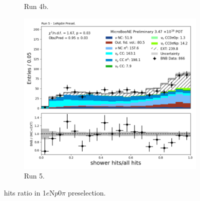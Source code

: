 \begin{figure}[H]
\begin{subfigure}[t]{0.32\linewidth}
        \caption{Run 4b.}
    \end{subfigure}%
    \hspace{0.2cm}%
    \begin{subfigure}[t]{0.32\linewidth}
        \includegraphics[width=\linewidth]{technote/Appendix_Preselection/Figures/1eNp0pi/Run5/hits_ratio_Run5_1eNp0pi_Presel.png}
        \caption{Run 5.}
    \end{subfigure}
    \caption{hits ratio in 1$e$N$p$0$\pi$ preselection.}
\end{figure}

